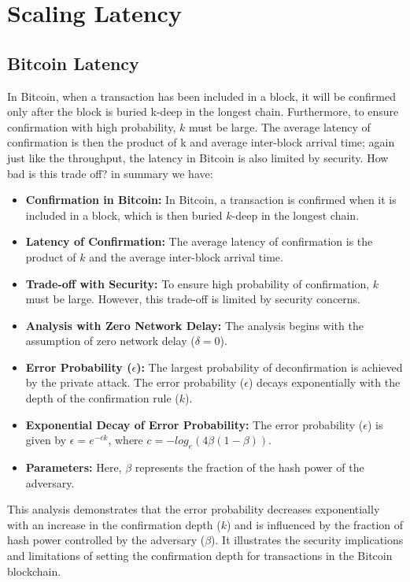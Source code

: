 \chapter{Scaling Latency}

\section{Bitcoin Latency}
In Bitcoin, when a transaction has been included in a block, it will be confirmed only after the block is buried k-deep in the longest chain. Furthermore, to ensure confirmation with high probability, $k$ must be large. The average latency of confirmation is then the product of k and average inter-block arrival time; again just like the throughput, the latency in Bitcoin is also limited by security. How bad is this trade oﬀ? in summary we have:
\begin{itemize}
	\item \textbf{Confirmation in Bitcoin:} In Bitcoin, a transaction is confirmed when it is included in a block, which is then buried $k$-deep in the longest chain.
	\item \textbf{Latency of Confirmation:}  The average latency of confirmation is the product of $k$ and the average inter-block arrival time.
	\item \textbf{Trade-off with Security:} To ensure high probability of confirmation, $k$ must be large. However, this trade-off is limited by security concerns.
	\item \textbf{Analysis with Zero Network Delay:} The analysis begins with the assumption of zero network delay ($\delta = 0$).
	\item \textbf{Error Probability ($\epsilon$): }  The largest probability of deconfirmation is achieved by the private attack. The error probability ($\epsilon$) decays exponentially with the depth of the confirmation rule ($k$).
	\item  \textbf{Exponential Decay of Error Probability:} The error probability ($\epsilon$) is given by $\epsilon = e^{-ck}$, where $c = - log_{e}(4\beta(1 - \beta))$.
	\item \textbf{Parameters:} Here, $\beta$ represents the fraction of the hash power of the adversary.
\end{itemize}
This analysis demonstrates that the error probability decreases exponentially with an increase in the confirmation depth ($k$) and is influenced by the fraction of hash power controlled by the adversary ($\beta$). It illustrates the security implications and limitations of setting the confirmation depth for transactions in the Bitcoin blockchain.
